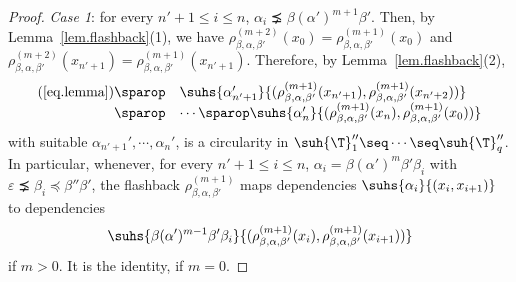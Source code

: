 \begin{proof}
\emph{Case 1}: for every $n'+1 \leq i \leq n$, 
$\alpha_{i} \precneq \beta (\alpha')^{m+1}\beta'$. Then, by 
Lemma~\ref{lem.flashback}(1), we have $\rho_{\beta,\alpha,\beta'}^{(m+2)}(x_{0}) = 
\rho_{\beta,\alpha,\beta'}^{(m+1)}(x_{0})$ and 
$\rho_{\beta,\alpha,\beta'}^{(m+2)}(x_{n'+1}) = 
\rho_{\beta,\alpha,\beta'}^{(m+1)}(x_{n'+1})$. Therefore, by 
Lemma~\ref{lem.flashback}(2), 
\[
\begin{array}{rl}
(\ref{eq.lemma})
\sparop &
\suhs{\alpha_{n'+1}'}{(\rho_{\beta,\alpha,\beta'}^{(m+1)}(x_{n'+1}),\rho_{\beta,\alpha,\beta'}^{(m+1)}(x_{n'+2}))}
\\
\sparop & \cdots \sparop \suhs{\alpha_{n}'}{(
\rho_{\beta,\alpha,\beta'}^{(m+1)}(x_{n}),\rho_{\beta,\alpha,\beta'}^{(m+1)}(x_{0}))}
\end{array}
\] 
with suitable $\alpha_{n'+1}', \cdots , \alpha_n'$, 
is a circularity in $ \suh{\T}_1''\seq\cdots\seq\suh{\T}_q''$. In particular, 
whenever, for every $n'+1 \leq i \leq n$, $\alpha_i = \beta (\alpha')^{m}\beta'\beta_i$ 
with $\varepsilon \precneq \beta_{i} \preceq \beta''\beta'$, the flashback 
$\rho_{\beta,\alpha,\beta'}^{(m+1)}$ maps dependencies $\suhs{\alpha_i}{(x_i,x_{i+1})}$ to 
dependencies 
\[
\suhs{\beta (\alpha')^{m-1}\beta'\beta_i}{(\rho_{\beta,\alpha,\beta'}^{(m+1)}(x_i),\rho_{\beta,\alpha,\beta'}^{(m+1)}(x_{i+1}))}
\]
 if $m >0$. It is the identity,
if $m=0$.


\end{proof}
